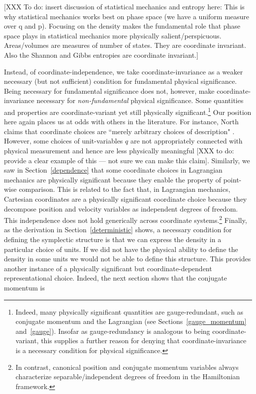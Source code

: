 \documentclass[letterpaper]{article}
\begin{document}

[XXX To do: insert discussion of statistical mechanics and entropy here: This is why statistical mechanics works best on phase space (we have a uniform measure over q and p). Focusing on the density makes the fundamental role that phase space plays in statistical mechanics more physically salient/perspicuous. Areas/volumes are measures of number of states. They are coordinate invariant. Also the Shannon and Gibbs entropies are coordinate invariant.]

Instead, of coordinate-independence, we take coordinate-invariance as a weaker necessary (but not sufficient) condition for fundamental physical significance. Being necessary for fundamental significance does not, however, make coordinate-invariance necessary for \textit{non-fundamental} physical significance. Some quantities and properties are coordinate-variant yet still physically significant.\footnote{Indeed, many physically significant quantities are gauge-redundant, such as conjugate momentum and the Lagrangian (see Sections~\ref{gauge_momentum} and~\ref{gauge}). Insofar as gauge-redundancy is analogous to being coordinate-variant, this supplies a further reason for denying that coordinate-invariance is a necessary condition for physical significance.} Our position here again places us at odds with others in the literature. For instance, North claims that coordinate choices are ``merely arbitrary choices of description" \parencites*[61]{North}. However, some choices of unit-variables $q$ are not appropriately connected with physical measurement and hence are less physically meaningful [XXX to do: provide a clear example of this ---  not sure we can make this claim]. Similarly, we saw in Section~\ref{dependence} that some coordinate choices in Lagrangian mechanics are physically significant because they enable the property of point-wise comparison. This is related to the fact that, in Lagrangian mechanics, Cartesian coordinates are a physically significant coordinate choice because they decompose position and velocity variables as independent degrees of freedom. This independence does not hold generically across coordinate systems.\footnote{In contrast, canonical position and conjugate momentum variables always characterize separable/independent degrees of freedom in the Hamiltonian framework.} Finally, as the derivation in Section~\ref{deterministic} shows, a necessary condition for defining the symplectic structure is that we can express the density in a particular choice of units. If we did not have the physical ability to define the density in some units we would not be able to define this structure. This provides another instance of a physically significant but coordinate-dependent representational choice. Indeed, the next section shows that the conjugate momentum is
\end{document}
